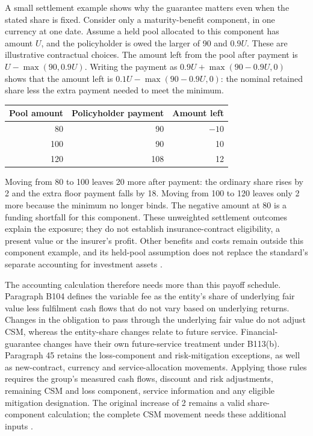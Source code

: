 \clearpage
A small settlement example shows why the guarantee matters even when the
stated share is fixed. Consider only a maturity-benefit component, in one
currency at one date. Assume a held pool allocated to this component has amount
$U$, and the policyholder is owed the larger of 90 and $0.9U$. These are
illustrative contractual choices. The amount left from the pool after payment
is $U-\max(90,0.9U)$. Writing the payment as
$0.9U+\max(90-0.9U,0)$ shows that the amount left is
$0.1U-\max(90-0.9U,0)$: the nominal retained share less the extra payment
needed to meet the minimum.

\begin{center}
\begin{tabular}{@{}rrr@{}}
\toprule
Pool amount & Policyholder payment & Amount left\\
\midrule
80 & 90 & $-10$\\
100 & 90 & 10\\
120 & 108 & 12\\
\bottomrule
\end{tabular}
\end{center}

Moving from 80 to 100 leaves 20 more after payment: the ordinary share rises
by 2 and the extra floor payment falls by 18. Moving from 100 to 120 leaves
only 2 more because the minimum no longer binds. The negative amount at 80
is a funding shortfall for this component. These unweighted settlement
outcomes explain the exposure; they do not establish insurance-contract
eligibility, a present value or the insurer's profit. Other benefits and costs
remain outside this component example, and its held-pool assumption does not
replace the standard's separate accounting for investment assets
\citep[paragraphs B66(a), B107--B108]{aasb17}.

The accounting calculation therefore needs more than this payoff schedule.
Paragraph B104 defines the variable fee as the entity's share of underlying
fair value less fulfilment cash flows that do not vary based on underlying
returns. Changes in the obligation to pass through the underlying fair value
do not adjust CSM, whereas the entity-share changes relate to future service.
Financial-guarantee changes have their own future-service treatment under
B113(b). Paragraph 45 retains the loss-component and risk-mitigation exceptions,
as well as new-contract, currency and service-allocation movements. Applying
those rules requires the group's measured cash flows, discount and risk
adjustments, remaining CSM and loss component, service information and any
eligible mitigation designation. The original increase of 2 remains a valid
share-component calculation; the complete CSM movement needs these additional
inputs \citep[paragraphs 32--38, 45, 48--50 and B104--B118]{aasb17}.

